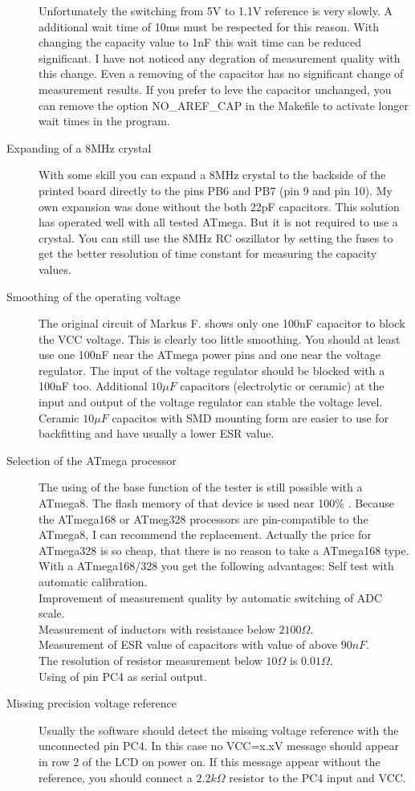 \begin{description}
Unfortunately the switching from 5V to 1.1V reference is very slowly. A additional
wait time of 10ms must be respected for this reason.
With changing the capacity value to 1nF this wait time can be reduced significant.
I have not noticed any degration of measurement quality with this change.
Even a removing of the capacitor has no significant change of measurement results.
If you prefer to leve the capacitor unchanged, you can remove the option NO\_AREF\_CAP
in the Makefile to activate longer wait times in the program.
\item[Expanding of a 8MHz crystal]
With some skill you can expand a 8MHz crystal to the backside of the printed board
directly to the pins PB6 and PB7 (pin 9 and pin 10).
My own expansion was done without the both 22pF capacitors.
This solution has operated well with all tested ATmega.
But it is not required to use a crystal. You can still use the 8MHz RC oszillator
by setting the fuses to get the better resolution of time constant for measuring  the capacity values.
\item[Smoothing of the operating voltage]
The original circuit of Markus F. shows only one 100nF capacitor to block the VCC voltage.
This is clearly too little smoothing. You should at least use one 100nF near the ATmega power pins
and one near the voltage regulator. The input of the voltage regulator should be
blocked with a 100nF too.
Additional \(10\mu F\) capacitors (electrolytic or ceramic) at the input and
output of the voltage regulator can stable the voltage level.
Ceramic \(10\mu F\) capacitos with SMD mounting form are easier to use for backfitting
and have usually a lower ESR value. 
\item[Selection of the ATmega processor]
The using of the base function of the tester is still possible with a ATmega8.
The flash memory of that device is used near 100\% .
Because the ATmega168 or ATmeg328 processors are pin-compatible to the ATmega8,
I can recommend the replacement.
Actually the price for ATmega328 is so cheap, that there is no reason to take
a ATmega168 type.
With a ATmega168/328 you get the following advantages:
Self test with automatic calibration.\\
Improvement of measurement quality by automatic switching of ADC scale.\\
Measurement of inductors with resistance  below \(2100 \Omega\).\\
Measurement of ESR value of capacitors with value of above  \(90 nF\).\\
The resolution of resistor measurement below \(10 \Omega\) is \(0.01 \Omega\).\\
Using of pin PC4 as serial output.\\
\item[Missing precision voltage reference]
Usually the software should detect the missing voltage reference with the unconnected pin PC4.
In this case no VCC=x.xV message should appear in row 2 of the LCD on power on.
If this message appear without the reference, you should connect a \(2.2k \Omega\) resistor
to the PC4 input and VCC.


\end{description}

